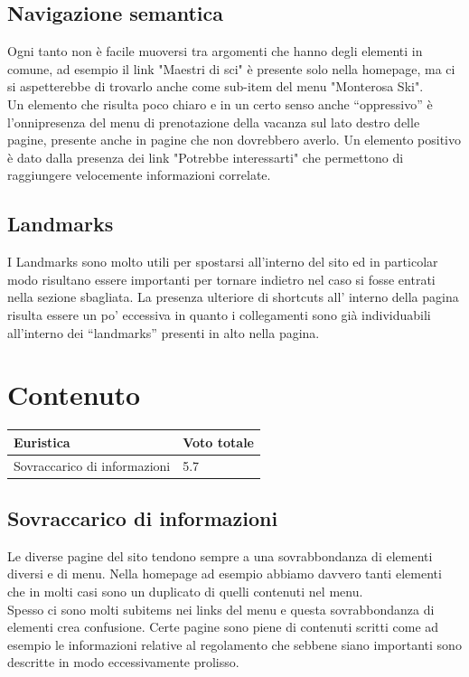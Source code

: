         \subsection{Navigazione semantica}
        Ogni tanto non è facile muoversi tra argomenti che hanno degli elementi
        in comune, ad esempio il link "Maestri di sci" è presente solo nella
        homepage, ma ci si aspetterebbe di trovarlo anche come sub-item del menu
        "Monterosa Ski". \\ Un elemento che risulta poco chiaro e in un
        certo senso anche “oppressivo” è l’onnipresenza del menu di
        prenotazione della vacanza sul lato destro delle pagine, presente anche
        in pagine che non dovrebbero averlo.
        Un elemento positivo è dato dalla presenza dei link
        "Potrebbe interessarti" che permettono di raggiungere velocemente
        informazioni correlate.

        \subsection{Landmarks}
        I Landmarks sono molto utili per spostarsi all'interno del sito ed in
        particolar modo risultano essere importanti per tornare indietro nel
        caso si fosse entrati nella sezione sbagliata. 
        La presenza ulteriore di shortcuts all’ interno della pagina risulta
        essere un po’ eccessiva in quanto i collegamenti sono già individuabili
        all'interno dei “landmarks” presenti in alto nella pagina.
    \section{Contenuto}
    \begin{table}[H]
        \begin{tabular}{|l|l|}
        \hline \textbf{Euristica}& \textbf{Voto totale} \\ \hline
        Sovraccarico di informazioni    & 5.7 \\ \hline
        \end{tabular}
        \end{table}
        \subsection{Sovraccarico di informazioni}
        Le diverse pagine del sito tendono sempre a una sovrabbondanza di
        elementi diversi e di menu. Nella homepage ad esempio abbiamo davvero
        tanti elementi che in molti casi sono un duplicato di quelli contenuti
        nel menu.\\ Spesso ci sono molti subitems nei links del menu e questa
        sovrabbondanza di elementi crea confusione. Certe pagine sono piene di
        contenuti scritti come ad esempio le informazioni relative al
        regolamento che sebbene siano importanti sono descritte in modo
        eccessivamente prolisso.
